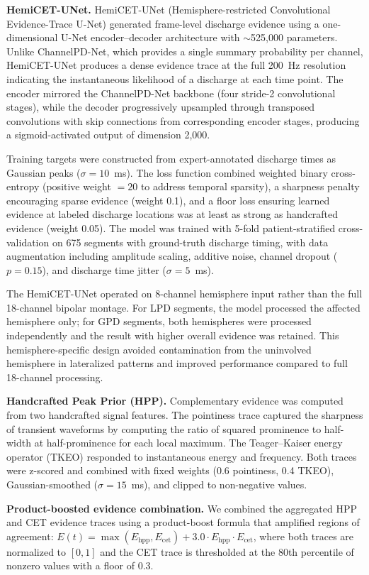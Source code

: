 \documentclass{iopjournal}
\begin{document}
\textbf{HemiCET-UNet.} HemiCET-UNet (Hemisphere-restricted Convolutional Evidence-Trace U-Net) generated frame-level discharge evidence using a one-dimensional U-Net encoder--decoder architecture with $\sim$525,000 parameters. Unlike ChannelPD-Net, which provides a single summary probability per channel, HemiCET-UNet produces a dense evidence trace at the full 200~Hz resolution indicating the instantaneous likelihood of a discharge at each time point. The encoder mirrored the ChannelPD-Net backbone (four stride-2 convolutional stages), while the decoder progressively upsampled through transposed convolutions with skip connections from corresponding encoder stages, producing a sigmoid-activated output of dimension 2,000.

Training targets were constructed from expert-annotated discharge times as Gaussian peaks ($\sigma = 10$~ms). The loss function combined weighted binary cross-entropy (positive weight $= 20$ to address temporal sparsity), a sharpness penalty encouraging sparse evidence (weight 0.1), and a floor loss ensuring learned evidence at labeled discharge locations was at least as strong as handcrafted evidence (weight 0.05). The model was trained with 5-fold patient-stratified cross-validation on 675 segments with ground-truth discharge timing, with data augmentation including amplitude scaling, additive noise, channel dropout ($p = 0.15$), and discharge time jitter ($\sigma = 5$~ms).

The HemiCET-UNet operated on 8-channel hemisphere input rather than the full 18-channel bipolar montage. For LPD segments, the model processed the affected hemisphere only; for GPD segments, both hemispheres were processed independently and the result with higher overall evidence was retained. This hemisphere-specific design avoided contamination from the uninvolved hemisphere in lateralized patterns and improved performance compared to full 18-channel processing.

\textbf{Handcrafted Peak Prior (HPP).} Complementary evidence was computed from two handcrafted signal features. The pointiness trace captured the sharpness of transient waveforms by computing the ratio of squared prominence to half-width at half-prominence for each local maximum. The Teager--Kaiser energy operator (TKEO) responded to instantaneous energy and frequency. Both traces were z-scored and combined with fixed weights (0.6 pointiness, 0.4 TKEO), Gaussian-smoothed ($\sigma = 15$~ms), and clipped to non-negative values.

\textbf{Product-boosted evidence combination.} We combined the aggregated HPP and CET evidence traces using a product-boost formula that amplified regions of agreement: $E(t) = \max(E_\mathrm{hpp}, E_\mathrm{cet}) + 3.0 \cdot E_\mathrm{hpp} \cdot E_\mathrm{cet}$, where both traces are normalized to $[0,1]$ and the CET trace is thresholded at the 80th percentile of nonzero values with a floor of 0.3.
\end{document}
